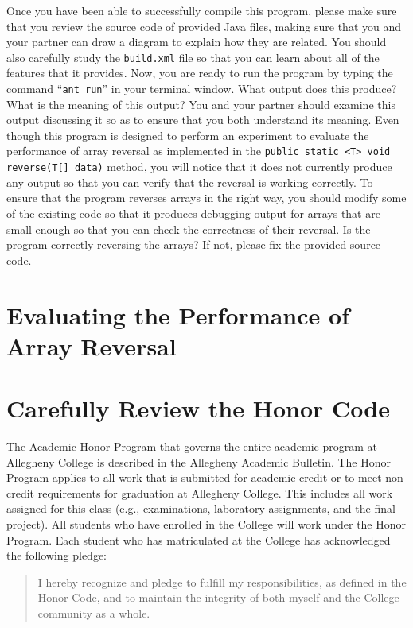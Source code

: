 Once you have been able to successfully compile this program, please make sure that you review the source code of
provided Java files, making sure that you and your partner can draw a diagram to explain how they are related. You
should also carefully study the {\tt build.xml} file so that you can learn about all of the features that it provides.
Now, you are ready to run the program by typing the command ``{\tt ant run}'' in your terminal window. What output does
this produce? What is the meaning of this output? You and your partner should examine this output discussing it so as to
ensure that you both understand its meaning. Even though this program is designed to perform an experiment to evaluate
the performance of array reversal as implemented in the {\tt public static <T> void reverse(T[] data)} method, you will
notice that it does not currently produce any output so that you can verify that the reversal is working correctly. To
ensure that the program reverses arrays in the right way, you should modify some of the existing code so that it
produces debugging output for arrays that are small enough so that you can check the correctness of their reversal. Is
the program correctly reversing the arrays? If not, please fix the provided source code.

\section*{Evaluating the Performance of Array Reversal}



\section*{Carefully Review the Honor Code}

The Academic Honor Program that governs the entire academic program at Allegheny College is described in the Allegheny
Academic Bulletin.  The Honor Program applies to all work that is submitted for academic credit or to meet non-credit
requirements for graduation at Allegheny College.  This includes all work assigned for this class (e.g., examinations,
  laboratory assignments, and the final project).  All students who have enrolled in the College will work under the Honor
Program.  Each student who has matriculated at the College has acknowledged the following pledge:

\vspace*{-.1in}
\begin{quote}
  I hereby recognize and pledge to fulfill my responsibilities, as defined in the Honor Code, and to maintain the
  integrity of both myself and the College community as a whole.
\end{quote}
\vspace*{-.1in}

